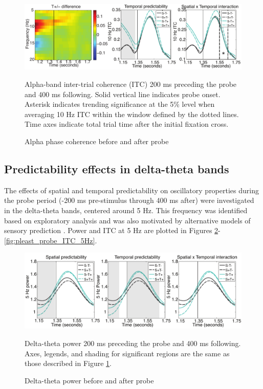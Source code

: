 \documentclass[dwyatte_dissertation.tex]{subfiles}
\begin{document}
\begin{figure}[h!]
\begin{center}
\includegraphics[width=160mm]{figs/chap_pleast/results_powphase_probe_ITC_montage.pdf}
\end{center}
\caption{Alpha phase coherence before and after probe}{Alpha-band inter-trial coherence (ITC) 200 ms preceding the probe and 400 ms following. Solid vertical line indicates probe onset. Asterisk indicates trending significance at the 5\% level when averaging 10 Hz ITC within the window defined by the dotted lines. Time axes indicate total trial time after the initial fixation cross.}
\label{fig:pleast_probe_ITC_10Hz}
\end{figure}

\subsection{Predictability effects in delta-theta bands}
The effects of spatial and temporal predictability on oscillatory properties during the probe period (-200 ms pre-stimulus through 400 ms after) were investigated in the delta-theta bands, centered around 5 Hz. This frequency was identified based on exploratory analysis and was also motivated by alternative models of sensory prediction \cite[e.g.,]{ArnalGiraud12,GiraudPoeppel12}. Power and ITC at 5 Hz are plotted in Figures \ref{fig:pleast_probe_pow_5Hz}-\ref{fig:pleast_probe_ITC_5Hz}.

\begin{figure}[h!]
\begin{center}
\includegraphics[width=160mm]{figs/chap_pleast/results_powphase_probe_5Hz_pow_montage.pdf}
\end{center}
\caption{Delta-theta power before and after probe}{Delta-theta power 200 ms preceding the probe and 400 ms following. Axes, legends, and shading for significant regions are the same as those described in Figure \ref{fig:pleast_probe_ITC_10Hz}.}
\label{fig:pleast_probe_pow_5Hz}
\end{figure}
\end{document}
